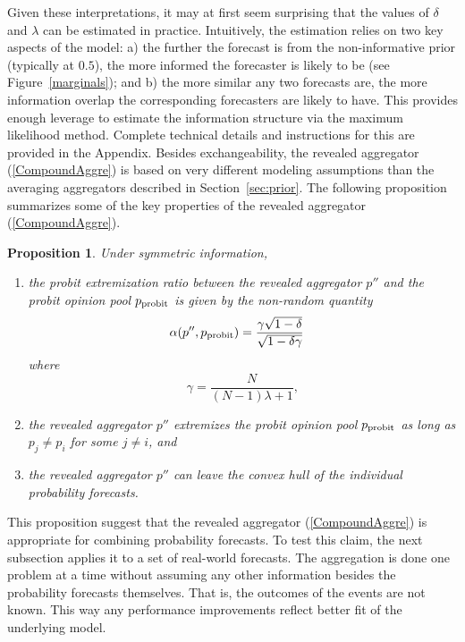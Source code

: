 \documentclass[11pt]{article}
\newtheorem{proposition}[theorem]{Proposition}
\theoremstyle{definition}
\theoremstyle{definition}
\def\probit{p_{\rm probit}}
\begin{document}
Given these interpretations, it may at first seem surprising that the
values of $\delta$ and $\lambda$ can be estimated in practice.
Intuitively, the estimation relies on two key aspects of the model: a)
the further the forecast is from the non-informative prior (typically
at $0.5$), the more informed the forecaster is likely to be (see
Figure~\ref{marginals}); and b) the more similar any two forecasts
are, the more information overlap the corresponding forecasters are
likely to have. This provides enough leverage to estimate the
information structure via the maximum likelihood method.  Complete
technical details and instructions for this are provided in the
Appendix.  Besides exchangeability, the revealed aggregator
(\ref{CompoundAggre}) is based on very different modeling assumptions
than the averaging aggregators described in
Section~\ref{sec:prior}. The following proposition summarizes some of
the key properties of the revealed aggregator (\ref{CompoundAggre}).

\begin{proposition} \label{positiveThm}
Under symmetric information, 
\begin{enumerate}
\item[$(i)$] the probit extremization ratio between the revealed
aggregator $p''$ and the probit opinion pool $\probit$ is given by the
non-random quantity
\begin{align*}
\alpha(p'', \probit)
 &=  \frac{\gamma \sqrt{1 - \delta}}{\sqrt{1-\delta\gamma}}
\end{align*}
where
$$\gamma = \frac{N}{(N-1)\lambda +1},$$
\item[$(ii)$] the revealed aggregator $p''$ extremizes the probit
opinion pool $\probit$ as long as $p_j \neq p_i$ for some $j \neq i$,
and
\item[$(iii)$] the revealed aggregator $p''$ can leave the convex hull
of the individual probability forecasts.
\end{enumerate}
\end{proposition}
This proposition suggest that the revealed aggregator
(\ref{CompoundAggre}) is appropriate for combining probability
forecasts. To test this claim, the next subsection applies it to a set
of real-world forecasts. The aggregation is done one problem at a time
without assuming any other information besides the probability
forecasts themselves. That is, the outcomes of the events are not
known. This way any performance improvements reflect better fit of the
underlying model.
\end{document}
